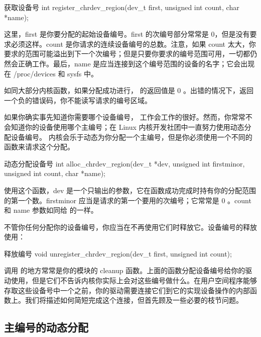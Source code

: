 \documentclass[lang=cn,newtx,10pt,scheme=chinese]{elegantbook}
\begin{document}
\begin{mycode}{获取设备号}
int register_chrdev_region(dev_t first, unsigned int count, char *name);
\end{mycode}

这里，first 是你要分配的起始设备编号。first 的次编号部分常常是 0，但是没有要求必须这样。count 是你请求的连续设备编号的总数。注意，如果 count 太大，你要求的范围可能溢出到下一个次编号；但是只要你要求的编号范围可用，一切都仍然会正确工作。最后，name 是应当连接到这个编号范围的设备的名字；它会出现在 /proc/devices 和 sysfs 中。

如同大部分内核函数，如果分配成功进行， 的返回值是 0 。出错的情况下，返回一个负的错误码，你不能读写请求的编号区域。

如果你确实事先知道你需要哪个设备编号， 工作会工作的很好。然而，你常常不会知道你的设备使用哪个主编号；在 Linux 内核开发社团中一直努力使用动态分配设备编号。 内核会乐于动态为你分配一个主编号，但是你必须使用一个不同的函数来请求这个分配。

\begin{mycode}{动态分配设备号}
int alloc_chrdev_region(dev_t *dev, unsigned int firstminor, unsigned int count, char *name);
\end{mycode}

使用这个函数，dev 是一个只输出的参数，它在函数成功完成时持有你的分配范围的第一个数。firstminor 应当是请求的第一个要用的次编号；它常常是 0 。count 和 name 参数如同给  的一样。

不管你任何分配你的设备编号，你应当在不再使用它们时释放它。设备编号的释放使用：

\begin{mycode}{释放编号}
void unregister_chrdev_region(dev_t first, unsigned int count);
\end{mycode}

调用  的地方常常是你的模块的 cleanup 函数。上面的函数分配设备编号给你的驱动使用，但是它们不告诉内核你实际上会对这些编号做什么。在用户空间程序能够存取这些设备号中一个之前，你的驱动需要连接它们到它的实现设备操作的内部函数上。我们将描述如何简短完成这个连接，但首先顾及一些必要的枝节问题。

\subsection{主编号的动态分配}
\end{document}
